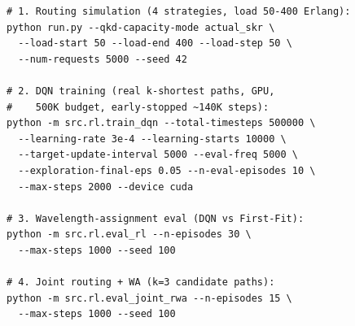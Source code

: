 \documentclass[conference]{IEEEtran}
\begin{document}
\begingroup\scriptsize
\begin{verbatim}
# 1. Routing simulation (4 strategies, load 50-400 Erlang):
python run.py --qkd-capacity-mode actual_skr \
  --load-start 50 --load-end 400 --load-step 50 \
  --num-requests 5000 --seed 42

# 2. DQN training (real k-shortest paths, GPU,
#    500K budget, early-stopped ~140K steps):
python -m src.rl.train_dqn --total-timesteps 500000 \
  --learning-rate 3e-4 --learning-starts 10000 \
  --target-update-interval 5000 --eval-freq 5000 \
  --exploration-final-eps 0.05 --n-eval-episodes 10 \
  --max-steps 2000 --device cuda

# 3. Wavelength-assignment eval (DQN vs First-Fit):
python -m src.rl.eval_rl --n-episodes 30 \
  --max-steps 1000 --seed 100

# 4. Joint routing + WA (k=3 candidate paths):
python -m src.rl.eval_joint_rwa --n-episodes 15 \
  --max-steps 1000 --seed 100
\end{verbatim}
\endgroup
\end{document}
